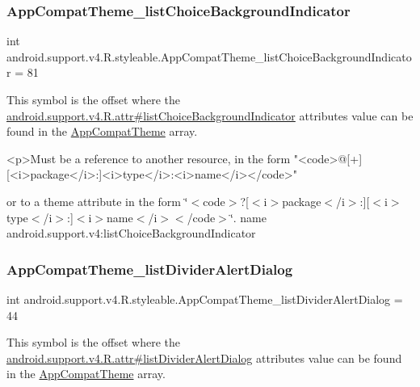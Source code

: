 \subsubsection{\texorpdfstring{App\+Compat\+Theme\+\_\+list\+Choice\+Background\+Indicator}{AppCompatTheme\_listChoiceBackgroundIndicator}}
{\footnotesize\ttfamily int android.\+support.\+v4.\+R.\+styleable.\+App\+Compat\+Theme\+\_\+list\+Choice\+Background\+Indicator = 81\hspace{0.3cm}{\ttfamily [static]}}

This symbol is the offset where the \hyperlink{classandroid_1_1support_1_1v4_1_1R_1_1attr_af7eefe308947e12a94677f65e23aff36}{android.\+support.\+v4.\+R.\+attr\#list\+Choice\+Background\+Indicator} attribute\textquotesingle{}s value can be found in the \hyperlink{classandroid_1_1support_1_1v4_1_1R_1_1styleable_ac07ebbe62ed977f6dcaadc6397840ace}{App\+Compat\+Theme} array.

\begin{DoxyVerb}      <p>Must be a reference to another resource, in the form "<code>@[+][<i>package</i>:]<i>type</i>:<i>name</i></code>"
\end{DoxyVerb}
 or to a theme attribute in the form \char`\"{}$<$code$>$?\mbox{[}$<$i$>$package$<$/i$>$\+:\mbox{]}\mbox{[}$<$i$>$type$<$/i$>$\+:\mbox{]}$<$i$>$name$<$/i$>$$<$/code$>$\char`\"{}.  name android.\+support.\+v4\+:list\+Choice\+Background\+Indicator \mbox{\label{classandroid_1_1support_1_1v4_1_1R_1_1styleable_aeb30dd09362a7481a0324462b2ac5c82}} 
\subsubsection{\texorpdfstring{App\+Compat\+Theme\+\_\+list\+Divider\+Alert\+Dialog}{AppCompatTheme\_listDividerAlertDialog}}
{\footnotesize\ttfamily int android.\+support.\+v4.\+R.\+styleable.\+App\+Compat\+Theme\+\_\+list\+Divider\+Alert\+Dialog = 44\hspace{0.3cm}{\ttfamily [static]}}

This symbol is the offset where the \hyperlink{classandroid_1_1support_1_1v4_1_1R_1_1attr_af03f26f416a7488e6cc6869ead2e96c7}{android.\+support.\+v4.\+R.\+attr\#list\+Divider\+Alert\+Dialog} attribute\textquotesingle{}s value can be found in the \hyperlink{classandroid_1_1support_1_1v4_1_1R_1_1styleable_ac07ebbe62ed977f6dcaadc6397840ace}{App\+Compat\+Theme} array.

